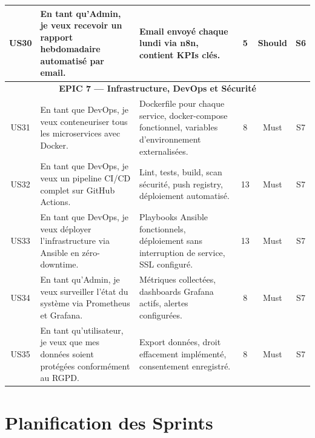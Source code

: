 \documentclass[12pt,a4paper]{report}
\begin{document}
\begin{longtable}{|c|p{4.5cm}|p{5.5cm}|c|c|c|}
US30 &
  En tant qu'Admin, je veux recevoir un rapport hebdomadaire
  automatis\'{e} par email. &
  Email envoy\'{e} chaque lundi via n8n, contient KPIs cl\'{e}s. &
  5 & Should & S6 \\
\hline

\multicolumn{6}{|c|}{\cellcolor{primary!30}
  \textbf{EPIC 7 --- Infrastructure, DevOps et S\'{e}curit\'{e}}} \\
\hline

US31 &
  En tant que DevOps, je veux conteneuriser tous les microservices
  avec Docker. &
  Dockerfile pour chaque service, docker-compose fonctionnel,
  variables d'environnement externalis\'{e}es. &
  8 & Must & S7 \\
\hline

US32 &
  En tant que DevOps, je veux un pipeline CI/CD complet sur
  GitHub Actions. &
  Lint, tests, build, scan s\'{e}curit\'{e}, push registry,
  d\'{e}ploiement automatis\'{e}. &
  13 & Must & S7 \\
\hline

US33 &
  En tant que DevOps, je veux d\'{e}ployer l'infrastructure via
  Ansible en z\'{e}ro-downtime. &
  Playbooks Ansible fonctionnels, d\'{e}ploiement sans interruption
  de service, SSL configur\'{e}. &
  13 & Must & S7 \\
\hline

US34 &
  En tant qu'Admin, je veux surveiller l'\'{e}tat du syst\`{e}me
  via Prometheus et Grafana. &
  M\'{e}triques collect\'{e}es, dashboards Grafana actifs,
  alertes configur\'{e}es. &
  8 & Must & S7 \\
\hline

US35 &
  En tant qu'utilisateur, je veux que mes donn\'{e}es soient
  prot\'{e}g\'{e}es conform\'{e}ment au RGPD. &
  Export donn\'{e}es, droit effacement impl\'{e}ment\'{e},
  consentement enregistr\'{e}. &
  8 & Must & S7 \\
\hline

\end{longtable}

\section{Planification des Sprints}
\end{document}
